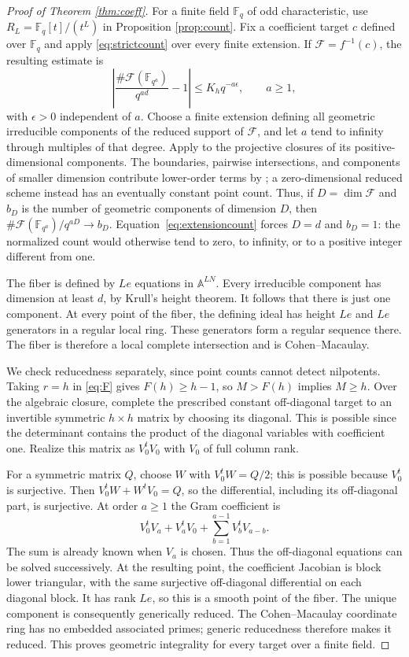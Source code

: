 \documentclass[11pt]{article}
\numberwithin{equation}{section}
\theoremstyle{remark}
\newcommand{\A}{\mathbb A}
\newcommand{\F}{\mathbb F}
\begin{document}
\begin{proof}[Proof of Theorem \ref{thm:coeff}]
For a finite field $\F_q$ of odd characteristic, use
$R_L=\F_q[t]/(t^L)$ in Proposition \ref{prop:count}.
Fix a coefficient target $c$ defined over $\F_q$ and apply
\eqref{eq:strictcount} over every finite extension. If $\mathcal F=f^{-1}(c)$,
the resulting estimate is
\begin{equation}\label{eq:extensioncount}
 \left|\frac{\#\mathcal F(\F_{q^a})}{q^{ad}}-1\right|
       \le K_hq^{-a\epsilon},\qquad a\ge1,
\end{equation}
with $\epsilon>0$ independent of $a$. Choose a finite extension
defining all geometric irreducible components of the reduced support
of $\mathcal F$, and let $a$ tend to infinity through multiples of that degree.
Apply \cite[Theorem 1]{LW} to the projective closures of its
positive-dimensional components. The boundaries, pairwise intersections,
and components of smaller dimension contribute lower-order terms by
\cite[Lemma 1]{LW}; a zero-dimensional reduced scheme instead has
an eventually constant point count. Thus, if $D=\dim \mathcal F$ and $b_D$
is the number of geometric components of dimension $D$, then
$\#\mathcal F(\F_{q^a})/q^{aD}\to b_D$. Equation~\eqref{eq:extensioncount}
forces $D=d$ and $b_D=1$: the normalized count would otherwise tend
to zero, to infinity, or to a positive integer different from one.

The fiber is defined by $Le$ equations in $\A^{LN}$.
Every irreducible component has dimension at least $d$, by
Krull's height theorem. It follows that there is just one
component. At every point of the fiber, the defining ideal has
height $Le$ and $Le$ generators in a regular local ring. These
generators form a regular sequence there. The fiber is therefore
a local complete intersection and is Cohen--Macaulay.

We check reducedness separately, since point counts cannot detect
nilpotents. Taking $r=h$ in \eqref{eq:F} gives $F(h)\ge h-1$,
so $M>F(h)$ implies $M\ge h$. Over the algebraic closure, complete
the prescribed constant off-diagonal target to an invertible
symmetric $h\times h$ matrix by choosing its diagonal. This is
possible since the determinant contains the product of the
diagonal variables with coefficient one. Realize this matrix
as $V_0^tV_0$ with $V_0$ of full column rank.

For a symmetric matrix $Q$, choose $W$ with $V_0^tW=Q/2$;
this is possible because $V_0^t$ is surjective. Then
$V_0^tW+W^tV_0=Q$, so the differential, including its off-diagonal
part, is surjective. At order $a\ge1$ the Gram coefficient is
\[
 V_0^tV_a+V_a^tV_0+
       \sum_{b=1}^{a-1}V_b^tV_{a-b}.
\]
The sum is already known when $V_a$ is chosen. Thus the off-diagonal
equations can be solved successively. At the resulting point, the
coefficient Jacobian is block lower triangular, with the same
surjective off-diagonal differential on each diagonal block.
It has rank $Le$, so this is a smooth point of the fiber.
The unique component is consequently generically reduced. The
Cohen--Macaulay coordinate ring has no embedded associated primes;
generic reducedness therefore makes it reduced. This proves
geometric integrality for every target over a finite field.


\end{proof}
\end{document}

